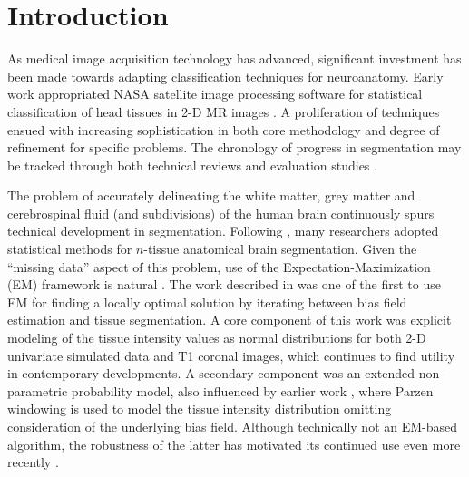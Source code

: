 \documentclass[11pt,english]{article}
\begin{document}

\clearpage

\section{Introduction} As medical image acquisition technology has advanced,
significant investment has been made towards adapting classification
techniques for neuroanatomy.  Early work appropriated NASA
satellite image processing software for statistical classification of
head tissues in 2-D MR images \citep{Vannier1985}.  A proliferation of
techniques ensued with increasing sophistication in both core
methodology and degree of refinement for specific problems.  The
chronology of progress in segmentation may be tracked through both
technical reviews
\citep{Bezdek1993,Pal1993,Clarke1995,Pham2000,Viergever2001,Suri2002,Duncan2004,Balafar2010}
and evaluation studies
\citep[e.g.][]{Cuadra2005,Zaidi2006,Klauschen2009,Boer2010}.

The problem of accurately delineating the white matter, grey matter
and cerebrospinal fluid (and subdivisions) of the human brain continuously spurs
technical development in segmentation.  Following \cite{Vannier1985},
many researchers adopted statistical methods for $n$-tissue anatomical
brain segmentation.  Given the ``missing data'' aspect of this
problem, use of the Expectation-Maximization (EM) framework is natural \citep{Dempster1977}.  The
work described in \cite{Wells1996} was one of the first to use EM for
finding a locally optimal solution by iterating between bias field
estimation and tissue segmentation.  A core component of this work was
explicit modeling of the tissue intensity values as normal
distributions \citep{Cline1990} for both 2-D univariate simulated data
and T1 coronal images, which continues to find utility in contemporary
developments.  A secondary component was an extended non-parametric
probability model, also influenced by earlier work \citep{Kikinis1992}, where
Parzen windowing is used to model the tissue intensity distribution
omitting consideration of the underlying bias field.  Although
technically not an EM-based algorithm, the robustness of the latter has motivated its continued use even more recently \citep[e.g.][]{Weisenfeld2009}.
\end{document}
